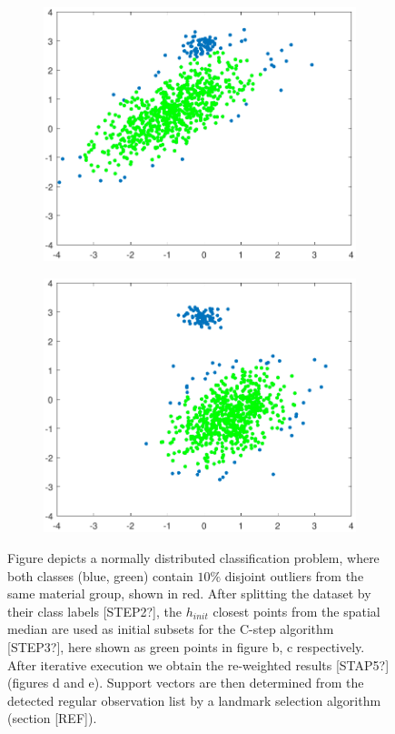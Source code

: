 \documentclass[preprint,12pt]{elsarticle}
\begin{document}
\begin{figure}[!htb]
	\begin{subfigure}[b]{0.40\linewidth}
		\centering\includegraphics[width=1\linewidth]{figures/kcstep/c1output.pdf}
		\caption{\label{fig:kcstepc1}}
	\end{subfigure}
	\begin{subfigure}[b]{0.40\linewidth}
		\centering\includegraphics[width=1\linewidth]{figures/kcstep/c2output.pdf}
		\caption{\label{fig:kcstepc2}}
	\end{subfigure}

	\caption{
		Figure  depicts a normally distributed classification problem, where both classes (blue, green) contain $10\%$ disjoint outliers from the same material group, shown in red. After splitting the dataset by their class labels [STEP2?], the $h_ {init} $ closest points from the spatial median are used as initial subsets for the C-step algorithm [STEP3?], here shown as green points in figure b, c respectively. After iterative execution we obtain the re-weighted results [STAP5?] (figures d and e). Support vectors are then determined from the detected regular observation list by a landmark selection algorithm (section [REF]).}
\end{figure}
 
\end{document}
